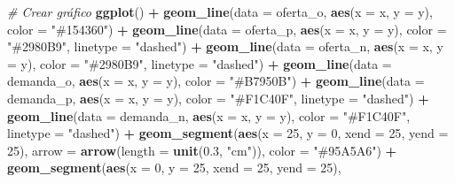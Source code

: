 \documentclass[
  spanish,
  12pt,
]{book}
\newenvironment{Shaded}{\begin{snugshade}}{\end{snugshade}}
\newcommand{\AttributeTok}[1]{\textcolor[rgb]{0.13,0.29,0.53}{#1}}
\newcommand{\CommentTok}[1]{\textcolor[rgb]{0.56,0.35,0.01}{\textit{#1}}}
\newcommand{\DecValTok}[1]{\textcolor[rgb]{0.00,0.00,0.81}{#1}}
\newcommand{\FloatTok}[1]{\textcolor[rgb]{0.00,0.00,0.81}{#1}}
\newcommand{\FunctionTok}[1]{\textcolor[rgb]{0.13,0.29,0.53}{\textbf{#1}}}
\newcommand{\NormalTok}[1]{#1}
\newcommand{\SpecialCharTok}[1]{\textcolor[rgb]{0.81,0.36,0.00}{\textbf{#1}}}
\newcommand{\StringTok}[1]{\textcolor[rgb]{0.31,0.60,0.02}{#1}}
\begin{document}
\begin{Shaded}
\begin{Highlighting}[]
\CommentTok{\# Crear gráfico}
\FunctionTok{ggplot}\NormalTok{() }\SpecialCharTok{+}
  \FunctionTok{geom\_line}\NormalTok{(}\AttributeTok{data =}\NormalTok{ oferta\_o, }\FunctionTok{aes}\NormalTok{(}\AttributeTok{x =}\NormalTok{ x, }\AttributeTok{y =}\NormalTok{ y), }\AttributeTok{color =} \StringTok{"\#154360"}\NormalTok{) }\SpecialCharTok{+}
  \FunctionTok{geom\_line}\NormalTok{(}\AttributeTok{data =}\NormalTok{ oferta\_p, }\FunctionTok{aes}\NormalTok{(}\AttributeTok{x =}\NormalTok{ x, }\AttributeTok{y =}\NormalTok{ y), }\AttributeTok{color =} \StringTok{"\#2980B9"}\NormalTok{, }
            \AttributeTok{linetype =} \StringTok{"dashed"}\NormalTok{) }\SpecialCharTok{+}
  \FunctionTok{geom\_line}\NormalTok{(}\AttributeTok{data =}\NormalTok{ oferta\_n, }\FunctionTok{aes}\NormalTok{(}\AttributeTok{x =}\NormalTok{ x, }\AttributeTok{y =}\NormalTok{ y), }\AttributeTok{color =} \StringTok{"\#2980B9"}\NormalTok{, }
            \AttributeTok{linetype =} \StringTok{"dashed"}\NormalTok{) }\SpecialCharTok{+}
  \FunctionTok{geom\_line}\NormalTok{(}\AttributeTok{data =}\NormalTok{ demanda\_o, }\FunctionTok{aes}\NormalTok{(}\AttributeTok{x =}\NormalTok{ x, }\AttributeTok{y =}\NormalTok{ y), }\AttributeTok{color =} \StringTok{"\#B7950B"}\NormalTok{) }\SpecialCharTok{+}
  \FunctionTok{geom\_line}\NormalTok{(}\AttributeTok{data =}\NormalTok{ demanda\_p, }\FunctionTok{aes}\NormalTok{(}\AttributeTok{x =}\NormalTok{ x, }\AttributeTok{y =}\NormalTok{ y), }\AttributeTok{color =} \StringTok{"\#F1C40F"}\NormalTok{, }
            \AttributeTok{linetype =} \StringTok{"dashed"}\NormalTok{) }\SpecialCharTok{+}
  \FunctionTok{geom\_line}\NormalTok{(}\AttributeTok{data =}\NormalTok{ demanda\_n, }\FunctionTok{aes}\NormalTok{(}\AttributeTok{x =}\NormalTok{ x, }\AttributeTok{y =}\NormalTok{ y), }\AttributeTok{color =} \StringTok{"\#F1C40F"}\NormalTok{, }
            \AttributeTok{linetype =} \StringTok{"dashed"}\NormalTok{) }\SpecialCharTok{+} 
    \FunctionTok{geom\_segment}\NormalTok{(}\FunctionTok{aes}\NormalTok{(}\AttributeTok{x =} \DecValTok{25}\NormalTok{, }\AttributeTok{y =} \DecValTok{0}\NormalTok{, }\AttributeTok{xend =} \DecValTok{25}\NormalTok{, }\AttributeTok{yend =} \DecValTok{25}\NormalTok{),}
               \AttributeTok{arrow =} \FunctionTok{arrow}\NormalTok{(}\AttributeTok{length =} \FunctionTok{unit}\NormalTok{(}\FloatTok{0.3}\NormalTok{, }\StringTok{"cm"}\NormalTok{)), }
               \AttributeTok{color =} \StringTok{"\#95A5A6"}\NormalTok{) }\SpecialCharTok{+}
  \FunctionTok{geom\_segment}\NormalTok{(}\FunctionTok{aes}\NormalTok{(}\AttributeTok{x =} \DecValTok{0}\NormalTok{, }\AttributeTok{y =} \DecValTok{25}\NormalTok{, }\AttributeTok{xend =} \DecValTok{25}\NormalTok{, }\AttributeTok{yend =} \DecValTok{25}\NormalTok{),}

\end{Highlighting}
\end{Shaded}
\end{document}
